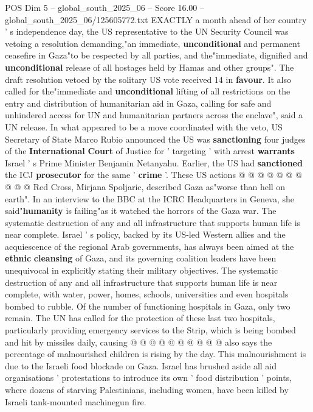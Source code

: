\begin{textsample}{POS Dim 5 – global\_south\_2025\_06 – Score 16.00 – global\_south\_2025\_06/125605772.txt}  \label{ex:f5_pos_060}
EXACTLY a month ahead of her country ' s independence day, the US representative to the UN Security Council was vetoing a resolution demanding,"an immediate, \textbf{unconditional} and permanent ceasefire in Gaza"to be respected by all parties, and the"immediate, dignified and \textbf{unconditional} release of all hostages held by Hamas and other groups".
The draft resolution vetoed by the solitary US vote received 14 in \textbf{favour}.
It also called for the"immediate and \textbf{unconditional} lifting of all restrictions on the entry and distribution of humanitarian aid in Gaza, calling for safe and unhindered access for UN and humanitarian partners across the enclave", said a UN release.
In what appeared to be a move coordinated with the veto, US Secretary of State Marco Rubio announced the US was \textbf{sanctioning} four judges of the \textbf{International} \textbf{Court} of Justice for ' targeting ' with arrest \textbf{warrants} Israel ' s Prime Minister Benjamin Netanyahu.
Earlier, the US had \textbf{sanctioned} the ICJ \textbf{prosecutor} for the same ' \textbf{crime} '.
These US actions @ @ @ @ @ @ @ @ @ @ Red Cross, Mirjana Spoljaric, described Gaza as"worse than hell on earth".
In an interview to the BBC at the ICRC Headquarters in Geneva, she said"\textbf{humanity} is failing"as it watched the horrors of the Gaza war.
The systematic destruction of any and all infrastructure that supports human life is near complete.
Israel ' s policy, backed by its US-led Western allies and the acquiescence of the regional Arab governments, has always been aimed at the \textbf{ethnic} \textbf{cleansing} of Gaza, and its governing coalition leaders have been unequivocal in explicitly stating their military objectives.
The systematic destruction of any and all infrastructure that supports human life is near complete, with water, power, homes, schools, universities and even hospitals bombed to rubble.
Of the number of functioning hospitals in Gaza, only two remain.
The UN has called for the protection of these last two hospitals, particularly providing emergency services to the Strip, which is being bombed and hit by missiles daily, causing @ @ @ @ @ @ @ @ @ @ also says the percentage of malnourished children is rising by the day.
This malnourishment is due to the Israeli food blockade on Gaza.
Israel has brushed aside all aid organisations ' protestations to introduce its own ' food distribution ' points, where dozens of starving Palestinians, including women, have been killed by Israeli tank-mounted machinegun fire.

\end{textsample}
